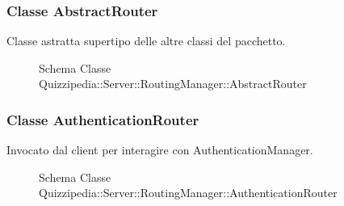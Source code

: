 \subsubsection{Classe AbstractRouter}
Classe astratta supertipo delle altre classi del pacchetto.
\begin{figure}[H]
\centering
\noindent{}
\caption[Schema Classe AbstractRouter]{Schema Classe Quizzipedia::Server::RoutingManager::AbstractRouter}
\end{figure}
\subsubsection{Classe AuthenticationRouter}
Invocato dal client per interagire con AuthenticationManager.
\begin{figure}[H]
\centering
\noindent{}
\caption[Schema Classe AuthenticationRouter]{Schema Classe Quizzipedia::Server::RoutingManager::AuthenticationRouter}
\end{figure}
